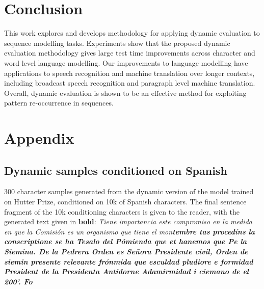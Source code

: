 \documentclass{article}
\begin{document}
\section{Conclusion}

This work explores and develops methodology for applying dynamic evaluation to sequence modelling tasks. Experiments show that the proposed dynamic evaluation methodology gives large test time improvements across character and word level language modelling. Our improvements to language modelling have applications to speech recognition and machine translation over longer contexts, including broadcast speech recognition and paragraph level machine translation. Overall, dynamic evaluation is shown to be an effective method for exploiting pattern re-occurrence in sequences.

{\setlength{\bibsep}{0pt plus 0.3ex}\footnotesize

}
\appendix
\section{Appendix}
\subsection{Dynamic samples conditioned on Spanish}
300 character samples generated from the dynamic version of the model trained on Hutter Prize, conditioned on 10k of Spanish characters. The final sentence fragment of the 10k conditioning characters is given to the reader, with the generated text given in \textbf{bold}:
\newline
\newline
\newline
\textsl{
Tiene importancia este compromiso en la medida en que la Comisión es un organismo que tiene el mon\textbf{tembre tas procedíns la conscriptione se ha Tesalo del Pómienda que et hanemos que Pe la Siemina.
\newline
De la Pedrera Orden es Señora Presidente civil, Orden de siemin presente relevante frónmida que esculdad pludiore e formidad President de la Presidenta Antidorne Adamirmidad i ciemano de el 200'. Fo}
}
\end{document}
